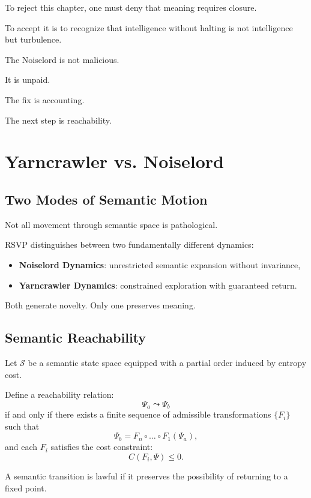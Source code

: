 \documentclass[11pt]{book}
\begin{document}
To reject this chapter, one must deny that meaning requires closure.

To accept it is to recognize that intelligence without halting is not
intelligence but turbulence.

The Noiselord is not malicious.

It is unpaid.

The fix is accounting.

The next step is reachability.


\chapter{Yarncrawler vs. Noiselord}

\section{Two Modes of Semantic Motion}

Not all movement through semantic space is pathological.

RSVP distinguishes between two fundamentally different dynamics:

\begin{itemize}
\item \textbf{Noiselord Dynamics}: unrestricted semantic expansion without invariance,
\item \textbf{Yarncrawler Dynamics}: constrained exploration with guaranteed return.
\end{itemize}

Both generate novelty.
Only one preserves meaning.

\section{Semantic Reachability}

Let \(\mathcal{S}\) be a semantic state space equipped with a partial order
induced by entropy cost.

Define a reachability relation:
\[
\Psi_a \leadsto \Psi_b
\]
if and only if there exists a finite sequence of admissible transformations
\(\{F_i\}\) such that
\[
\Psi_b = F_n \circ \dots \circ F_1 (\Psi_a),
\]
and each \(F_i\) satisfies the cost constraint:
\[
C(F_i, \Psi) \leq 0.
\]

\begin{definition}
A semantic transition is lawful if it preserves the possibility of returning to
a fixed point.
\end{definition}
\end{document}
